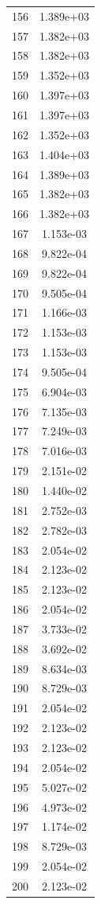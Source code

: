 \documentclass[12pt]{article}
\begin{document}
\begin{longtable}{@{}cc@{}}
156 & 1.389e+03 \\
157 & 1.382e+03 \\
158 & 1.382e+03 \\
159 & 1.352e+03 \\
160 & 1.397e+03 \\
161 & 1.397e+03 \\
162 & 1.352e+03 \\
163 & 1.404e+03 \\
164 & 1.389e+03 \\
165 & 1.382e+03 \\
166 & 1.382e+03 \\
167 & 1.153e-03 \\
168 & 9.822e-04 \\
169 & 9.822e-04 \\
170 & 9.505e-04 \\
171 & 1.166e-03 \\
172 & 1.153e-03 \\
173 & 1.153e-03 \\
174 & 9.505e-04 \\
175 & 6.904e-03 \\
176 & 7.135e-03 \\
177 & 7.249e-03 \\
178 & 7.016e-03 \\
179 & 2.151e-02 \\
180 & 1.440e-02 \\
181 & 2.752e-03 \\
182 & 2.782e-03 \\
183 & 2.054e-02 \\
184 & 2.123e-02 \\
185 & 2.123e-02 \\
186 & 2.054e-02 \\
187 & 3.733e-02 \\
188 & 3.692e-02 \\
189 & 8.634e-03 \\
190 & 8.729e-03 \\
191 & 2.054e-02 \\
192 & 2.123e-02 \\
193 & 2.123e-02 \\
194 & 2.054e-02 \\
195 & 5.027e-02 \\
196 & 4.973e-02 \\
197 & 1.174e-02 \\
198 & 8.729e-03 \\
199 & 2.054e-02 \\
200 & 2.123e-02 \\

\end{longtable}
\end{document}
